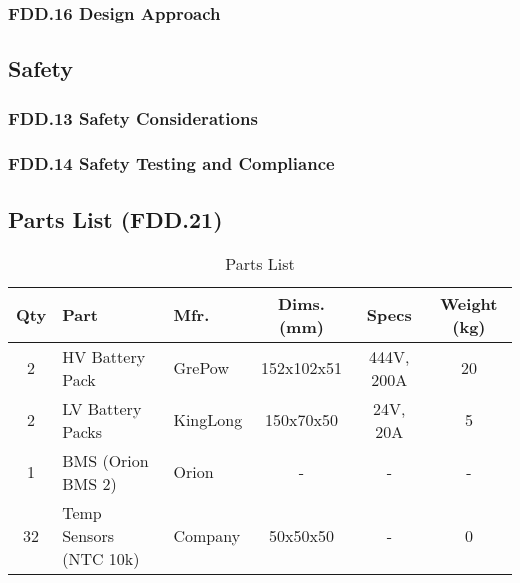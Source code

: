 \subsubsection{FDD.16 Design Approach}
 
\subsection{Safety}
\subsubsection{FDD.13 Safety Considerations}
 
\subsubsection{FDD.14 Safety Testing and Compliance}
 
\subsection{Parts List (FDD.21)}
\begin{table}[h]
    \centering
    \caption{Parts List}
    \begin{adjustbox}{width=1\textwidth, center}
    \begin{tabular}{|c|l|l|c|c|c|}
        \hline
        \textbf{Qty} & \textbf{Part} & \textbf{Mfr.} & \textbf{Dims. (mm)} & \textbf{Specs} & \textbf{Weight (kg)} \\
        \hline
        2 & HV Battery Pack & GrePow & 152x102x51 & 444V, 200A & 20 \\
        \hline
        2 & LV Battery Packs & KingLong & 150x70x50 & 24V, 20A & 5 \\
        \hline
        1 & BMS (Orion BMS 2) & Orion & - & - & - \\
        \hline
        32 & Temp Sensors (NTC 10k) & Company & 50x50x50 & - & 0 \\
        \hline
    \end{tabular}
    \end{adjustbox}
\end{table}


\newpage

